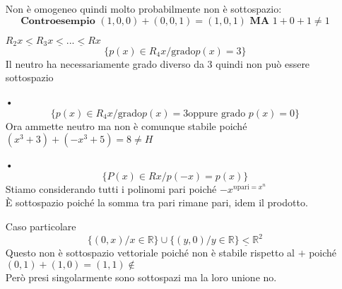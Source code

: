 \begin{itemize}
Non è omogeneo quindi molto probabilmente non è sottospazio:
$$ \textbf{Controesempio }  (1,0,0) + (0,0,1) = (1,0,1) \textbf{ MA } 1+0+1 \neq 1 $$
\item[$R_2x \underline{<} R_3x \underline{<} ... \underline{<} Rx$]
$$ \{p(x) \in R_4x / \text{grado} p(x) = 3\} $$
Il neutro ha necessariamente grado diverso da 3 quindi non può essere sottospazio
\item[•] $$ \{p(x) \in R_4x / \text{grado} p(x) = 3 \text{oppure grado } p(x) = 0 \} $$
Ora ammette neutro ma non è comunque stabile poiché $(x^3+3)+(-x^3+5) = 8 \neq H$
\item[•] $$ \{P(x) \in Rx / p(-x) = p(x) \}$$
Stiamo considerando tutti i polinomi pari poiché $-x^{n \text{pari} = x^n}$\\
È sottospazio poiché la somma tra pari rimane pari, idem il prodotto.
\item[Caso particolare] $$ \{(0,x) / x \in \mathbb{R} \} \cup \{(y,0) / y \in \mathbb{R} \} \underline{<} \mathbb{R}^2 $$
Questo non è sottospazio vettoriale poiché non è stabile rispetto al $+$ poiché $(0,1)+(1,0) = (1,1) \not \in$\\
Però presi singolarmente sono sottospazi ma la loro unione no.
\end{itemize}



